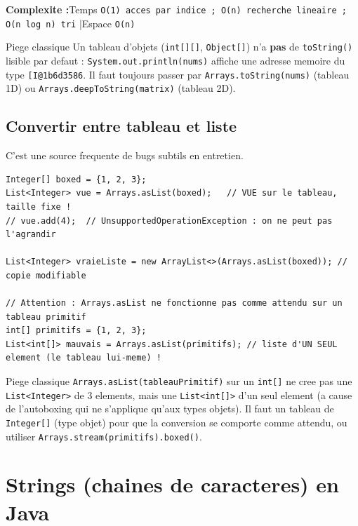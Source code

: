 \documentclass[11pt,a4paper]{article}
\newcommand{\complexite}[2]{%
  \noindent\textbf{Complexite :}\quad Temps \texttt{#1} \quad|\quad Espace \texttt{#2}\par\smallskip}
\begin{document}
\complexite{O(1) acces par indice ; O(n) recherche lineaire ; O(n log n) tri}{O(n)}

\begin{infobox}{Piege classique}
Un tableau d'objets (\texttt{int[][]}, \texttt{Object[]}) n'a \textbf{pas} de
\texttt{toString()} lisible par defaut : \texttt{System.out.println(nums)}
affiche une adresse memoire du type \texttt{[I@1b6d3586}. Il faut toujours
passer par \texttt{Arrays.toString(nums)} (tableau 1D) ou
\texttt{Arrays.deepToString(matrix)} (tableau 2D).
\end{infobox}

\subsection{Convertir entre tableau et liste}

C'est une source frequente de bugs subtils en entretien.

\begin{lstlisting}
Integer[] boxed = {1, 2, 3};
List<Integer> vue = Arrays.asList(boxed);   // VUE sur le tableau, taille fixe !
// vue.add(4);  // UnsupportedOperationException : on ne peut pas l'agrandir

List<Integer> vraieListe = new ArrayList<>(Arrays.asList(boxed)); // copie modifiable

// Attention : Arrays.asList ne fonctionne pas comme attendu sur un tableau primitif
int[] primitifs = {1, 2, 3};
List<int[]> mauvais = Arrays.asList(primitifs); // liste d'UN SEUL element (le tableau lui-meme) !
\end{lstlisting}

\begin{infobox}{Piege classique}
\texttt{Arrays.asList(tableauPrimitif)} sur un \texttt{int[]} ne cree pas une
\texttt{List<Integer>} de 3 elements, mais une \texttt{List<int[]>} d'un seul
element (a cause de l'autoboxing qui ne s'applique qu'aux types objets).
Il faut un tableau de \texttt{Integer[]} (type objet) pour que la conversion se
comporte comme attendu, ou utiliser \texttt{Arrays.stream(primitifs).boxed()}.
\end{infobox}

\newpage
\section{Strings (chaines de caracteres) en Java}
\end{document}
